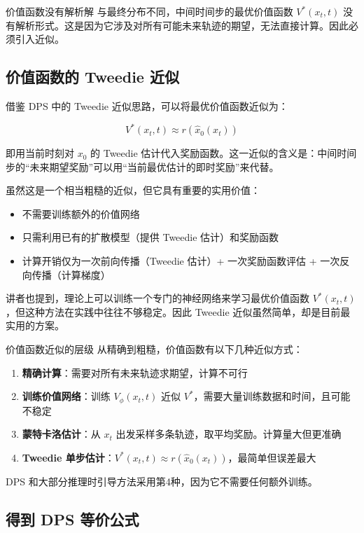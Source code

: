 \begin{warningbox}{价值函数没有解析解}
与最终分布不同，中间时间步的最优价值函数 $V^*(x_t, t)$ 没有解析形式。这是因为它涉及对所有可能未来轨迹的期望，无法直接计算。因此必须引入近似。
\end{warningbox}

\subsection{价值函数的 Tweedie 近似}

借鉴 DPS 中的 Tweedie 近似思路，可以将最优价值函数近似为：

$$V^*(x_t, t) \approx r(\hat{x}_0(x_t))$$

即用当前时刻对 $x_0$ 的 Tweedie 估计代入奖励函数。这一近似的含义是：中间时间步的``未来期望奖励''可以用``当前最优估计的即时奖励''来代替。

虽然这是一个相当粗糙的近似，但它具有重要的实用价值：

\begin{itemize}
    \item 不需要训练额外的价值网络
    \item 只需利用已有的扩散模型（提供 Tweedie 估计）和奖励函数
    \item 计算开销仅为一次前向传播（Tweedie 估计）+ 一次奖励函数评估 + 一次反向传播（计算梯度）
\end{itemize}

讲者也提到，理论上可以训练一个专门的神经网络来学习最优价值函数 $V^*(x_t, t)$，但这种方法在实践中往往不够稳定。因此 Tweedie 近似虽然简单，却是目前最实用的方案。

\begin{warningbox}{价值函数近似的层级}
从精确到粗糙，价值函数有以下几种近似方式：
\begin{enumerate}
    \item \textbf{精确计算}：需要对所有未来轨迹求期望，计算不可行
    \item \textbf{训练价值网络}：训练 $V_\phi(x_t, t)$ 近似 $V^*$，需要大量训练数据和时间，且可能不稳定
    \item \textbf{蒙特卡洛估计}：从 $x_t$ 出发采样多条轨迹，取平均奖励。计算量大但更准确
    \item \textbf{Tweedie 单步估计}：$V^*(x_t, t) \approx r(\hat{x}_0(x_t))$，最简单但误差最大
\end{enumerate}
DPS 和大部分推理时引导方法采用第4种，因为它不需要任何额外训练。
\end{warningbox}

\subsection{得到 DPS 等价公式}

